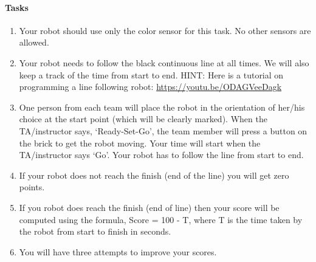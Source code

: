 \documentclass[11pt]{article}
\def\bluehref#1#2{\href{#1}{\color{blue} #2}}
\begin{document}
\paragraph{Tasks}
\begin{enumerate}
\item Your robot should use only the color sensor for this task. No other sensors are allowed.
\item Your robot needs to follow the black continuous line at all times. We will also keep a track of the time from start to end. HINT: Here is a tutorial on programming a line following robot: \bluehref{https://youtu.be/ODAGVeeDagk}{https://youtu.be/ODAGVeeDagk}
\item One person from each team will place the robot in the orientation of her/his choice at the start point (which will be clearly marked). When the TA/instructor says, `Ready-Set-Go', the team member will press a button on the brick to get the robot moving. Your time will start when the TA/instructor says `Go'. Your robot has to follow the line from start to end. 
\item If your robot does not reach the finish (end of the line) you will get zero points. 
\item If you robot does reach the finish (end of line) then your score will be computed using the formula, Score = 100 - T, where T is the time taken by the robot from start to finish in seconds.
\item You will have three attempts to improve your scores.

\end{enumerate}
\end{document}

